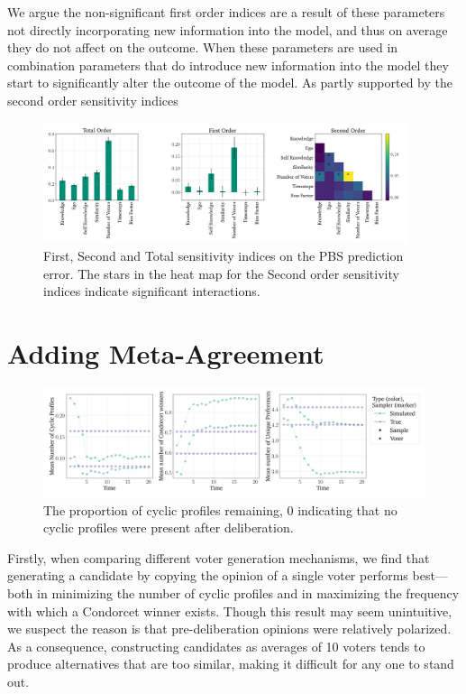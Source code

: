 We argue the non-significant first order indices are a result of these
parameters not directly incorporating new information into the model, and thus
on average they do not affect on the outcome. When these parameters are used in
combination parameters that do introduce new information into the model they
start to significantly alter the outcome of the model. As partly supported by
the second order sensitivity indices

\begin{figure}[ht]
	\begin{center}
		\includegraphics[width=0.95\textwidth]{Figures/senstivity_analysis.png}
	\end{center}
	\caption{First, Second and Total sensitivity indices on the PBS prediction error. The stars in the heat map for the Second order sensitivity indices indicate significant interactions. }\label{fig:sensitivty_pbs}
\end{figure}


\section{Adding Meta-Agreement}

\begin{figure}[htbp]
	\centering
	\centering
	\includegraphics[width=\textwidth]{Figures/three_measures.png
	}
	\caption{The proportion of cyclic profiles remaining, 0 indicating that no cyclic profiles were present after deliberation.}
	\label{fig:degroot_cyclic}
\end{figure}

Firstly, when comparing different voter generation mechanisms, we find that generating a candidate by copying the opinion of a single voter performs best—both in minimizing the number of cyclic profiles and in maximizing the frequency with which a Condorcet winner exists. Though this result may seem unintuitive, we suspect the reason is that pre-deliberation opinions were relatively polarized. As a consequence, constructing candidates as averages of 10 voters tends to produce alternatives that are too similar, making it difficult for any one to stand out.

